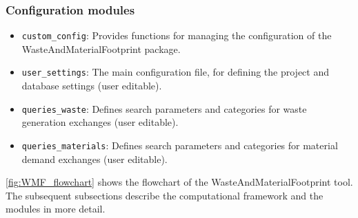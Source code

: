 \subsubsection{Configuration modules}
\begin{itemize}
    \item \texttt{custom\_config}: Provides functions for managing the configuration of the WasteAndMaterialFootprint package.
    \item \texttt{user\_settings}: The main configuration file, for defining the project and database settings (user editable).
    \item \texttt{queries\_waste}: Defines search parameters and categories for waste generation exchanges (user editable).
    \item \texttt{queries\_materials}: Defines search parameters and categories for material demand exchanges (user editable).
\end{itemize}

\autoref{fig:WMF_flowchart} shows the flowchart of the WasteAndMaterialFootprint tool. The subsequent subsections describe the computational framework and the modules in more detail.

